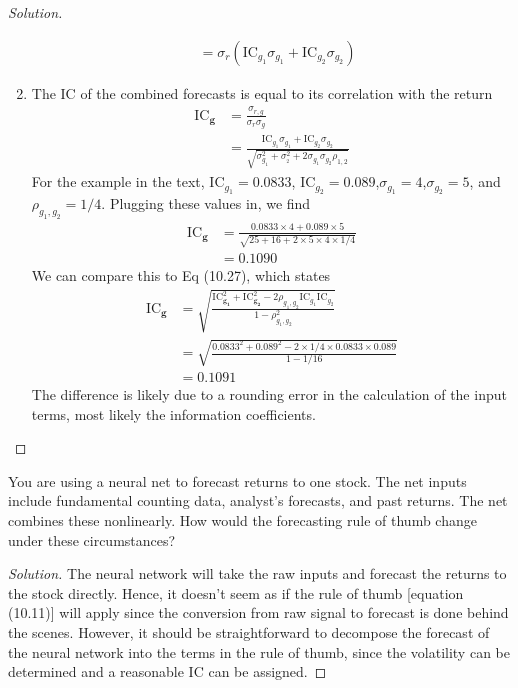 \begin{proof}[Solution]
\begin{enumerate}[label=(\alph*)]
{\begin{align*}
		    &=\sigma_{r}\left( \mathrm{IC}_{g_{1}}\sigma_{g_{1}}+\mathrm{IC}_{g_{2}}\sigma_{g_{2}}\right)
    \end{align*}
    }
    \item{The IC of the combined forecasts is equal to its correlation with the return
    \begin{align*}
     \mathrm{IC}_{\bm{g}}&=\frac{\sigma_{r,g}}{\sigma_{r}\sigma_{g}}\\
			 &=\frac{\mathrm{IC}_{g_{1}}\sigma_{g_{1}}+\mathrm{IC}_{g_{2}}\sigma_{g_{2}}}{\sqrt{\sigma_{g_1}^{2}+\sigma_{_2}^{2}+2\sigma_{g_1}\sigma_{g_2}\rho_{1,2}}}
    \end{align*}
    For the example in the text, $\mathrm{IC}_{g_{1}}=0.0833$, $\mathrm{IC}_{g_{2}}=0.089$,$\sigma_{g_{1}}=4$,$\sigma_{g_{2}}=5$, and $\rho_{g_1,g_2}=
1/4$. Plugging these values in, we find
  \begin{align*}
     \mathrm{IC}_{\bm{g}}&=\frac{0.0833\times4+0.089\times 5}{\sqrt{25+16+2\times 5\times4\times1/4}}\\
			 &=0.1090
  \end{align*}
  We can compare this to Eq (10.27), which states
  \begin{align*}
   \mathrm{IC}_{\bm{g}}&=\sqrt{\frac{\mathrm{IC}_{\bm{g_{1}}}^{2}+\mathrm{IC}_{\bm{g_{2}}}^{2}-2\rho_{g_{1},g_{2}}\mathrm{IC}_{g_{1}}\mathrm{IC}_{g_{2}}}{1-\rho_{g_{1},g_{2}}^{2}}}\\
		       &=\sqrt{\frac{0.0833^2+0.089^2-2\times1/4\times0.0833\times0.089}{1-1/16}}\\
		       &=0.1091
  \end{align*}
   The difference is likely due to a rounding error in the calculation of the input terms, most likely the information coefficients.
     }
  \end{enumerate}

\end{proof}


\begin{problem}{10.5}
  You are using a neural net to forecast returns to one stock. The net inputs include fundamental counting data, analyst's forecasts, and past returns. The net combines these nonlinearly. How would the forecasting rule of thumb change under these circumstances?
\end{problem}

\begin{proof}[Solution]
  The neural network will take the raw inputs and forecast the returns to the stock directly. Hence, it doesn't seem as if the rule of thumb [equation (10.11)] will apply since the conversion from raw signal to forecast is done behind the scenes. However, it should be straightforward to decompose the forecast of the neural network into the terms in the rule of thumb, since the volatility can be determined and a reasonable IC can be assigned.
\end{proof}

